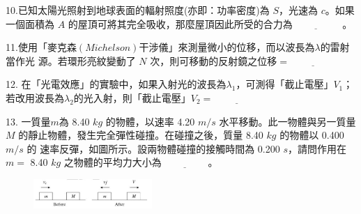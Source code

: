 \documentclass[cn,10pt,math=newtx]{elegantbook}
\begin{document}
\newpage


\begin{example}
   10.已知太陽光照射到地球表面的輻射照度(亦即：功率密度)為 $S$，光速為 $c$。如果一個面積為 $A$
的屋頂可將其完全吸收，那麼屋頂因此所受的合力為$\underline{\hspace{2cm}}$ 。\\
    \rightline{[桃園聯招教甄109]}
\end{example}
\begin{solution}
    
\end{solution}

\newpage


\begin{example}
   11.使用「麥克森$(Michelson)$干涉儀」來測量微小的位移，而以波長為$\lambda$的雷射當作光
源。若環形亮紋變動了 $N$ 次，則可移動的反射鏡之位移$=\underline{\hspace{2cm}}$\\
    \rightline{[桃園聯招教甄109]}
\end{example}
\begin{solution}
    
\end{solution}

\newpage


\begin{example}
   12. 在「光電效應」的實驗中，如果入射光的波長為$\lambda_1$，可測得「截止電壓」$V_1$； 若改用波長為$\lambda_2$的光入射，則「截止電壓」$V_2 =\underline{\hspace{2cm}}$\\
    \rightline{[桃園聯招教甄109]}
\end{example}
\begin{solution}
    
\end{solution}

\newpage


\begin{example}
   13. 一質量$m$為 8.40 $kg$ 的物體，以速率 4.20 $m/s$ 水平移動。此一物體與另一質量 $M$
的靜止物體，發生完全彈性碰撞。在碰撞之後，質量 8.40 $kg$ 的物體以 0.400 $m/s$ 的
速率反彈，如圖所示。設兩物體碰撞的接觸時間為 0.200 $s$，請問作用在 $m =$ 8.40 $kg$
之物體的平均力大小為$\underline{\hspace{2cm}}$。\\
    \rightline{[桃園聯招教甄109]}
\end{example}
\begin{solution}
    
\end{solution}
\begin{figure}[htbp]
    \flushright
    \includegraphics[width=0.4\textwidth]{image/109桃聯13.png}
  \end{figure}
\newpage
\end{document}
